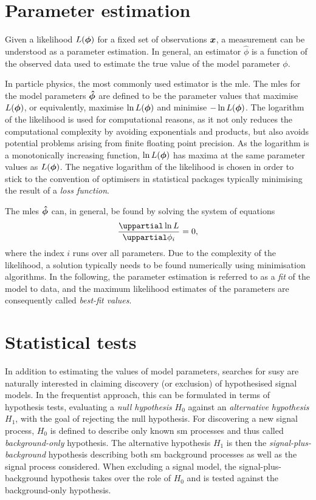 \section{Parameter estimation}

Given a likelihood $L(\makemebold{\phi})$ for a fixed set of observations $\makemebold{x}$, a measurement can be understood as a parameter estimation. In general, an estimator $\hat{\phi}$ is a function of the observed data used to estimate the true value of the model parameter $\phi$.

In particle physics, the most commonly used estimator is the \gls{mle}. The \glspl{mle} for the model parameters $\makemebold{\hat{\phi}}$ are defined to be the parameter values that maximise $L(\makemebold{\phi})$, or equivalently, maximise $\ln{L(\makemebold{\phi})}$ and minimise $-\ln{L(\makemebold{\phi})}$. The logarithm of the likelihood is used for computational reasons, as it not only reduces the computational complexity by avoiding exponentials and products, but also avoids potential problems arising from finite floating point precision. As the logarithm is a monotonically increasing function, $\ln{L(\makemebold{\phi})}$ has maxima at the same parameter values as ${L(\makemebold{\phi})}$. The negative logarithm of the likelihood is chosen in order to stick to the convention of optimisers in statistical packages typically minimising the result of a \textit{loss function}.

The \glspl{mle} $\makemebold{\hat{\phi}}$ can, in general, be found by solving the system of equations
\begin{equation}
 \frac{\uppartial \ln L}{\uppartial\phi_i} = 0,
\end{equation}
where the index $i$ runs over all parameters. Due to the complexity of the likelihood, a solution typically needs to be found numerically using minimisation algorithms. In the following, the parameter estimation is referred to as a \textit{fit} of the model to data, and the maximum likelihood estimates of the parameters are consequently called \textit{best-fit values}.

\section{Statistical tests}

In addition to estimating the values of model parameters, searches for \gls{susy} are naturally interested in claiming discovery (or exclusion) of hypothesised signal models.
In the frequentist approach, this can be formulated in terms of hypothesis tests, evaluating a \textit{null hypothesis} $H_0$ against an \textit{alternative hypothesis} $H_1$, with the goal of rejecting the null hypothesis.
For discovering a new signal process, $H_0$ is defined to describe only known \gls{sm} processes and thus called \textit{background-only} hypothesis.
The alternative hypothesis $H_1$ is then the \textit{signal-plus-background} hypothesis describing both \gls{sm} background processes as well as the signal process considered. When excluding a signal model, the signal-plus-background hypothesis takes over the role of $H_0$ and is tested against the background-only hypothesis.

